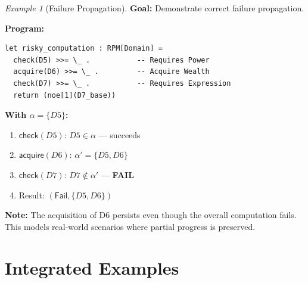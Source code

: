 \documentclass[11pt,twoside,openright]{book}
\theoremstyle{definition}
\theoremstyle{plain}
\theoremstyle{remark}
\newtheorem{example}[definition]{Example}
\newcommand{\Failed}{\mathsf{Fail}}
\begin{document}
\begin{example}[Failure Propagation]
\label{ex:failure-propagation}
\textbf{Goal:} Demonstrate correct failure propagation.

\textbf{Program:}
\begin{verbatim}
let risky_computation : RPM[Domain] =
  check(D5) >>= \_ .           -- Requires Power
  acquire(D6) >>= \_ .         -- Acquire Wealth
  check(D7) >>= \_ .           -- Requires Expression
  return (noe[1](D7_base))
\end{verbatim}

\textbf{With $\alpha = \{D5\}$:}
\begin{enumerate}
\item $\mathsf{check}(D5)$: $D5 \in \alpha$ — succeeds
\item $\mathsf{acquire}(D6)$: $\alpha' = \{D5, D6\}$
\item $\mathsf{check}(D7)$: $D7 \notin \alpha'$ — \textbf{FAIL}
\item Result: $(\Failed, \{D5, D6\})$
\end{enumerate}

\textbf{Note:} The acquisition of D6 persists even though the overall computation fails. This models real-world scenarios where partial progress is preserved.
\end{example}

\section{Integrated Examples}
\end{document}
